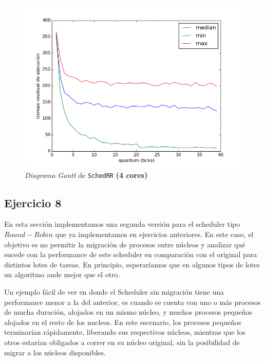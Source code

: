 \documentclass[11pt, a4paper, twoside]{article}
\begin{document}
\begin{figure}[H]
  \centering
  \includegraphics [width=\textwidth]{../graficos/metrica_eze_plot_batch_4core.png}
  \caption{\emph{Diagrama Gantt} de \texttt{SchedRR} \textbf{(4 cores)}}
  \label{fig:eze-4core}
\end{figure}





\clearpage
\subsection{Ejercicio 8}
En esta sección implementamos una segunda versión para el scheduler tipo $Round-Robin$ que ya implementamos
en ejercicios anteriores. En este caso, el objetivo es no permitir la migración de procesos entre núcleos y
analizar qué sucede con la performance de este scheduler en comparación con el original para distintos lotes
de tareas. En principio, esperaríamos que en algunos tipos de lotes un algoritmo ande mejor que el otro.

Un ejemplo fácil de ver en donde el Scheduler sin migración tiene una performance menor a la del anterior,
es cuando se cuenta con uno o más procesos de mucha duración, alojados en un mismo núcleo, y muchos procesos
pequeños alojados en el resto de los nucleos. En este escenario, los procesos pequeños terminarían rápidamente,
liberando sus respectivos núcleos, mientras que los otros estarían obligados a correr en su núcleo original, 
sin la posibilidad de migrar a los núcleos disponibles. 
\end{document}
